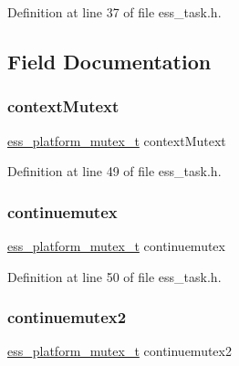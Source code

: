 Definition at line 37 of file ess\+\_\+task.\+h.



\subsection{Field Documentation}
\mbox{\label{structess__platform__task_af2a0b7dedca1f101c06a331d6e92b922}} 
\subsubsection{\texorpdfstring{context\+Mutext}{contextMutext}}
{\footnotesize\ttfamily \hyperlink{ess__mutex_8h_a35346d1f106b60abe884a13846173479}{ess\+\_\+platform\+\_\+mutex\+\_\+t} context\+Mutext}



Definition at line 49 of file ess\+\_\+task.\+h.

\mbox{\label{structess__platform__task_a22236d8d184eb7c41039a86bcf792380}} 
\subsubsection{\texorpdfstring{continuemutex}{continuemutex}}
{\footnotesize\ttfamily \hyperlink{ess__mutex_8h_a35346d1f106b60abe884a13846173479}{ess\+\_\+platform\+\_\+mutex\+\_\+t} continuemutex}



Definition at line 50 of file ess\+\_\+task.\+h.

\mbox{\label{structess__platform__task_afecd89745e3e4fa778a0bc75e57a5b6c}} 
\subsubsection{\texorpdfstring{continuemutex2}{continuemutex2}}
{\footnotesize\ttfamily \hyperlink{ess__mutex_8h_a35346d1f106b60abe884a13846173479}{ess\+\_\+platform\+\_\+mutex\+\_\+t} continuemutex2}




